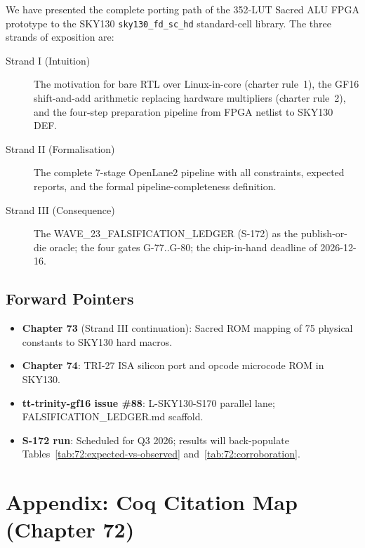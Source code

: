 We have presented the complete porting path of the 352-LUT Sacred ALU
FPGA prototype to the SKY130 \texttt{sky130\_fd\_sc\_hd} standard-cell library.
The three strands of exposition are:

\begin{description}
  \item[Strand I (Intuition)] The motivation for bare RTL over
    Linux-in-core (charter rule~1), the GF16 shift-and-add arithmetic
    replacing hardware multipliers (charter rule~2), and the four-step
    preparation pipeline from FPGA netlist to SKY130 DEF.
  \item[Strand II (Formalisation)] The complete 7-stage OpenLane2
    pipeline with all constraints, expected reports, and the formal
    pipeline-completeness definition.
  \item[Strand III (Consequence)] The WAVE\_23\_FALSIFICATION\_LEDGER
    (S-172) as the publish-or-die oracle; the four gates G-77..G-80;
    the chip-in-hand deadline of 2026-12-16.
\end{description}

\subsection{Forward Pointers}
\label{subsec:72:forward}

\begin{itemize}
  \item \textbf{Chapter 73} (Strand III continuation): Sacred ROM
    mapping of 75 physical constants to SKY130 hard macros.
  \item \textbf{Chapter 74}: TRI-27 ISA silicon port and opcode
    microcode ROM in SKY130.
  \item \textbf{tt-trinity-gf16 issue \#88}: L-SKY130-S170 parallel
    lane; FALSIFICATION\_LEDGER.md scaffold.
  \item \textbf{S-172 run}: Scheduled for Q3 2026; results will
    back-populate Tables~\ref{tab:72:expected-vs-observed}
    and~\ref{tab:72:corroboration}.
\end{itemize}

\section{Appendix: Coq Citation Map (Chapter 72)}
\label{sec:72:coq-map}

